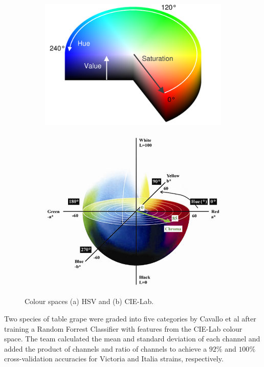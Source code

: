 \documentclass[fleqn,twoside,12pt]{report}
\begin{document}
\begin{figure}[h]
	\centering
	\begin{subfigure}{.5\textwidth}
		\centering
		\includegraphics[width=.7\linewidth]{hue_sat.png}
		\caption{}
		\label{fig:HSV}
	\end{subfigure}%
	\begin{subfigure}{.5\textwidth}
		\centering
		\includegraphics[width=.9\linewidth]{CIELab-colour-space.jpg}
		\caption{}
		\label{fig:Lab}
	\end{subfigure}%
	\caption{Colour spaces (a) HSV and (b) CIE-Lab.}
	\label{fig:colour-space}
\end{figure}

Two species of table grape were graded into five categories by Cavallo et al \cite{cavallo} after training a Random Forrest Classifier with features from the CIE-Lab colour space. The team calculated the mean and standard deviation of each channel and added the product of channels and ratio of channels to achieve a $92\%$ and $100\%$ cross-validation accuracies for Victoria and Italia strains, respectively.
\end{document}
